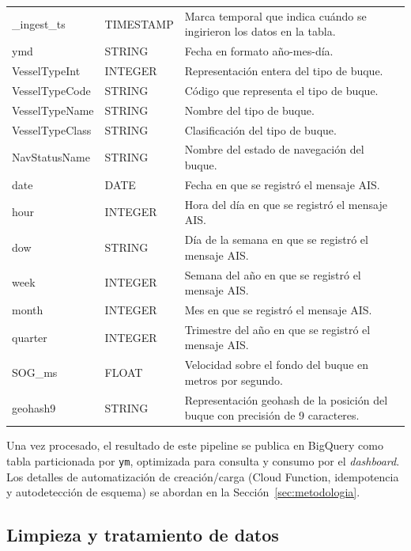 \documentclass[10pt]{article}
\begin{document}
\begin{table}[H]
\begin{tabular}{@{}llp{8cm}@{}}
  \_ingest\_ts & TIMESTAMP & Marca temporal que indica cuándo se ingirieron los datos en la tabla. \\
  ymd & STRING & Fecha en formato año-mes-día. \\
  VesselTypeInt & INTEGER & Representación entera del tipo de buque. \\
  VesselTypeCode & STRING & Código que representa el tipo de buque. \\
  VesselTypeName & STRING & Nombre del tipo de buque. \\
  VesselTypeClass & STRING & Clasificación del tipo de buque. \\
  NavStatusName & STRING & Nombre del estado de navegación del buque. \\
  date & DATE & Fecha en que se registró el mensaje AIS. \\
  hour & INTEGER & Hora del día en que se registró el mensaje AIS. \\
  dow & STRING & Día de la semana en que se registró el mensaje AIS. \\
  week & INTEGER & Semana del año en que se registró el mensaje AIS. \\
  month & INTEGER & Mes en que se registró el mensaje AIS. \\
  quarter & INTEGER & Trimestre del año en que se registró el mensaje AIS. \\
  SOG\_ms & FLOAT & Velocidad sobre el fondo del buque en metros por segundo. \\
  geohash9 & STRING & Representación geohash de la posición del buque con precisión de 9 caracteres. \\
  \bottomrule
  \end{tabular}
\end{table}

Una vez procesado, el resultado de este pipeline se publica en BigQuery como tabla particionada por \texttt{ym}, optimizada para consulta y consumo por el \textit{dashboard}. Los detalles de automatización de creación/carga (Cloud Function, idempotencia y autodetección de esquema) se abordan en la Sección~\ref{sec:metodologia}.
\subsection{Limpieza y tratamiento de datos} %
\label{sec:cleaning}
\end{document}
